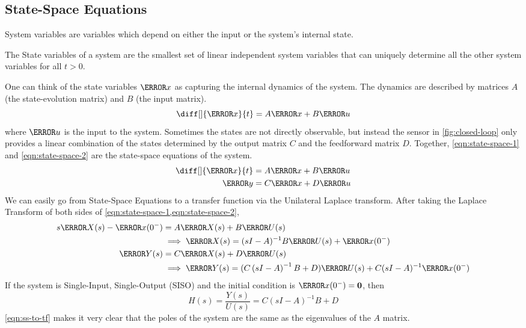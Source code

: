 \subsection{State-Space Equations}
\begin{definition}
  System variables are variables which depend on either the input or the system's internal state.
  \label{defn:system-vars}
\end{definition}
\begin{definition}
  The State variables of a system are the smallest set of linear independent system variables that can uniquely determine all the other system variables for all $t > 0$.
  \label{defn:state-vars}
\end{definition}
One can think of the state variables $\V{x}$ as capturing the internal dynamics of the system. The dynamics are described by matrices $A$ (the state-evolution matrix) and $B$ (the input matrix).
\[
  \diff[]{\V{x}}{t} = A\V{x} + B\V{u}
\]
where $\V{u}$ is the input to the system.
Sometimes the states are not directly observable, but instead the sensor in \cref{fig:closed-loop} only provides a linear combination of the states determined by the output matrix $C$ and the feedforward matrix $D$.
Together, \cref{eqn:state-space-1} and \cref{eqn:state-space-2} are the state-space equations of the system.
\begin{align}
  \diff[]{\V{x}}{t} &= A\V{x} + B\V{u} \label{eqn:state-space-1}\\
  \V{y} &= C\V{x} + D \V{u} \label{eqn:state-space-2}
\end{align}
We can easily go from State-Space Equations to a transfer function via the Unilateral Laplace transform. After taking the Laplace Transform of both sides of \cref{eqn:state-space-1,eqn:state-space-2},
\begin{align*}
  s\V{X}(s) - \V{x}(0^-) &= A\V{X}(s) + B\V{U}(s)\\
  &\implies \V{X}(s) = (sI-A)^{-1}B\V{U}(s) + \V{x}(0^{-})\\
  \V{Y}(s) &= C\V{X}(s) + D\V{U}(s)\\
  &\implies \V{Y}(s) = (C\left( sI-A \right)^{-1}B+D)\V{U}(s) + C(sI-A)^{-1}\V{x}(0^-)
\end{align*}
If the system is Single-Input, Single-Output (SISO) and the initial condition is $\V{x}(0^-) = \bs{0}$, then
\begin{equation}
  H(s) = \frac{Y(s)}{U(s)} = C(sI-A)^{-1}B+D
  \label{eqn:ss-to-tf}
\end{equation}
\cref{eqn:ss-to-tf} makes it very clear that the poles of the system are the same as the eigenvalues of the $A$ matrix.
